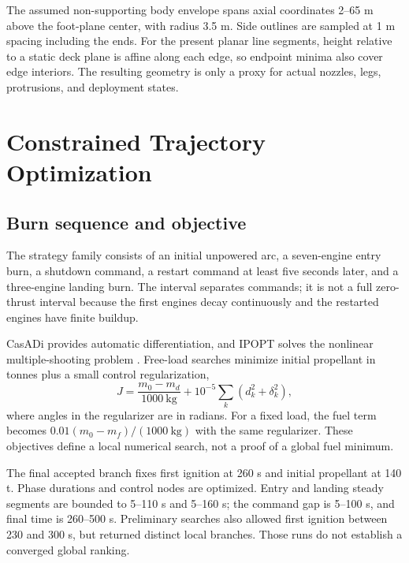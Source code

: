\documentclass[11pt,a4paper]{article}
\newcommand{\kg}{\mathrm{kg}}
\begin{document}
The assumed non-supporting body envelope spans axial coordinates 2--65 m above the foot-plane center, with radius 3.5 m. Side outlines are sampled at 1 m spacing including the ends. For the present planar line segments, height relative to a static deck plane is affine along each edge, so endpoint minima also cover edge interiors. The resulting geometry is only a proxy for actual nozzles, legs, protrusions, and deployment states.

\section{Constrained Trajectory Optimization}
\label{sec:optimization}
\subsection{Burn sequence and objective}
The strategy family consists of an initial unpowered arc, a seven-engine entry burn, a shutdown command, a restart command at least five seconds later, and a three-engine landing burn. The interval separates commands; it is not a full zero-thrust interval because the first engines decay continuously and the restarted engines have finite buildup.

CasADi provides automatic differentiation, and IPOPT solves the nonlinear multiple-shooting problem \cite{casadi,ipopt}. Free-load searches minimize initial propellant in tonnes plus a small control regularization,
\begin{equation}
 J=\frac{m_0-m_d}{1000\ \kg}
    +10^{-5}\sum_k(d_k^2+\delta_k^2),
\end{equation}
where angles in the regularizer are in radians. For a fixed load, the fuel term becomes $0.01(m_0-m_f)/(1000\ \kg)$ with the same regularizer. These objectives define a local numerical search, not a proof of a global fuel minimum.

The final accepted branch fixes first ignition at 260 s and initial propellant at 140 t. Phase durations and control nodes are optimized. Entry and landing steady segments are bounded to 5--110 s and 5--160 s; the command gap is 5--100 s, and final time is 260--500 s. Preliminary searches also allowed first ignition between 230 and 300 s, but returned distinct local branches. Those runs do not establish a converged global ranking.
\end{document}
